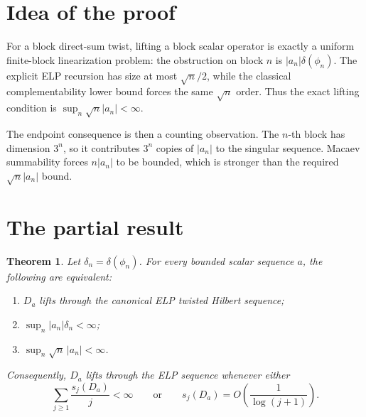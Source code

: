 \documentclass[11pt]{article}
\newtheorem{theorem}{Theorem}
\begin{document}
\section{Idea of the proof}

For a block direct-sum twist, lifting a block scalar operator is exactly a
uniform finite-block linearization problem: the obstruction on block $n$ is
$|a_n|\delta(\phi_n)$.  The explicit ELP recursion has size at most
$\sqrt n/2$, while the classical complementability lower bound forces the
same $\sqrt n$ order.  Thus the exact lifting condition is
$\sup_n\sqrt n|a_n|<\infty$.

The endpoint consequence is then a counting observation.  The $n$-th block
has dimension $3^n$, so it contributes $3^n$ copies of $|a_n|$ to the singular
sequence.  Macaev summability forces $n|a_n|$ to be bounded, which is stronger
than the required $\sqrt n|a_n|$ bound.

\section{The partial result}

\begin{theorem}\label{thm:main}
Let $\delta_n=\delta(\phi_n)$.  For every bounded scalar sequence $a$,
the following are equivalent:
\begin{enumerate}
 \item $D_a$ lifts through the canonical ELP twisted Hilbert sequence;
 \item $\sup_n |a_n|\delta_n<\infty$;
 \item $\sup_n \sqrt n\,|a_n|<\infty$.
\end{enumerate}
Consequently, $D_a$ lifts through the ELP sequence whenever either
\[
 \sum_{j\ge1}\frac{s_j(D_a)}j<\infty
 \qquad\text{or}\qquad
 s_j(D_a)=O\!\left(\frac1{\log(j+1)}\right).
\]
\end{theorem}
\end{document}
